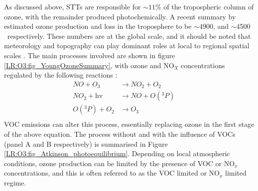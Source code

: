     As discussed above, STTs are responsible for $\sim 11\%$ of the 
    tropospheric column of ozone, with the remainder produced photochemically.
    A recent summary by \textcite{Young2018} estimated ozone production and 
    loss in the troposphere to be $\sim$4900\tgpyr, and $\sim$4500\tgpyr 
    ~respectively. 
    These numbers are at the global scale,  and it should be noted that 
    meteorology and topography can play dominant roles at local to regional 
    spatial scales \parencite[e.g.,][]{Kuang2017}.
    The main processes involved are shown in figure 
    \ref{LR:O3:fig_YoungOzoneSummary}, with ozone and NO$_X$ concentrations 
    regulated by the following reactions \parencite{Sillman1999,Atkinson2000}:
    \begin{equation}
    \begin{aligned}
    NO + O_3         & \to NO_2 + O_2      && \\%
    NO_2 + \text{hv} & \to NO + O({}^3P)   && \\%
    O({}^3P) + O_2   & \to O_3 			 && \\%
    \end{aligned}
    \label{LR:Atmos:Chem:eqn_NOandO3}
    \end{equation}
    VOC emissions can alter this process, essentially replacing ozone in the first stage of the above equation.
    The process without and with the influence of VOCs (panel A and B respectively) is summarised in Figure \ref{LR:O3:fig_Atkinson_photoequilibrium}.
    Depending on local atmospheric conditions, ozone production can be limited by the presence of VOC or NO$_x$ concentrations, and this is often referred to as the VOC limited or NO$_x$ limited regime.

    
